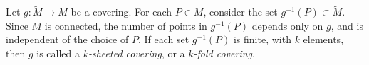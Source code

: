 Let $g: \tilde{M} \rightarrow M$ be a covering. For each $P \in M$, consider the set $g^{-1}(P) \subset \tilde{M}$. Since $M$ is connected, the number of points in $g^{-1}(P)$ depends only on $g$, and is independent of the choice of $P$. If each set $g^{-1}(P)$ is finite, with $k$ elements, then $g$ is called a \emph{$k$-sheeted covering}, or a \emph{$k$-fold covering}.
